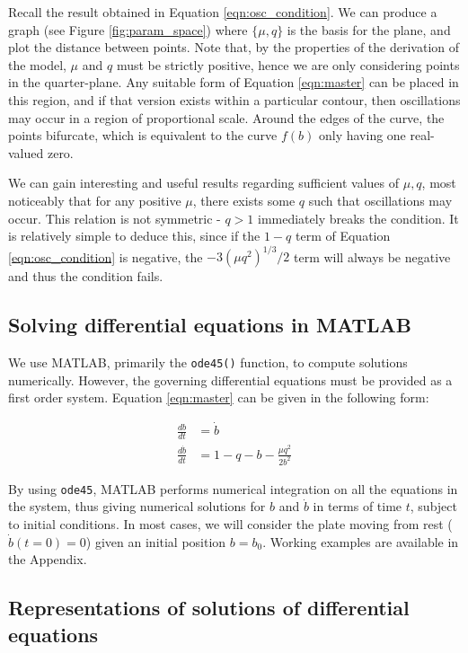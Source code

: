 \documentclass{article}
\begin{document}
Recall the result obtained in Equation \ref{eqn:osc_condition}.
We can produce a graph (see Figure \ref{fig:param_space}) where $\{\mu, q\}$ is the basis for the plane, and plot the distance between points.
Note that, by the properties of the derivation of the model,
$\mu$ and $q$ must be strictly positive,
hence we are only considering points in the quarter-plane.
Any suitable form of Equation \ref{eqn:master} can be placed in this region,
and if that version exists within a particular contour,
then oscillations may occur in a region of proportional scale.
Around the edges of the curve, the points bifurcate,
which is equivalent to the curve $f(b)$ only having one real-valued zero.

We can gain interesting and useful results regarding sufficient values of $\mu, q$,
most noticeably that for any positive $\mu$, there exists some $q$ such that oscillations may occur.
This relation is not symmetric - $q>1$ immediately breaks the condition.
It is relatively simple to deduce this, since if the $1-q$ term of Equation \ref{eqn:osc_condition} is negative,
the $-3(\mu q^2)^{1/3}/2$ term will always be negative and thus the condition fails.

\subsection{Solving differential equations in MATLAB}

We use MATLAB, primarily the \texttt{ode45()} function, to compute solutions numerically.
However, the governing differential equations must be provided as a first order system.
Equation \ref{eqn:master} can be given in the following form:

\begin{align}
    \frac{db}{dt}       & = \dot{b}                          \\
    \frac{d\dot{b}}{dt} & = 1 - q - b - \frac{\mu q^2}{2b^2}
    \label{eqn:first_order_system}
\end{align}

By using \texttt{ode45}, MATLAB performs numerical integration on all the equations in the system,
thus giving numerical solutions for $b$ and $\dot{b}$ in terms of time $t$, subject to initial conditions.
In most cases, we will consider the plate moving from rest ($\dot{b}(t=0) = 0$) given an initial position $b=b_0$.
Working examples are available in the Appendix.

\subsection{Representations of solutions of differential equations}
\end{document}
